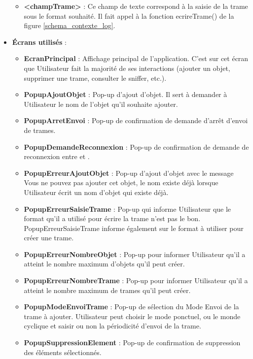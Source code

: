 \begin{itemize}
\begin{itemize}
            \item \textbf{<champTrame>} : Ce champ de texte correspond à la saisie de la trame sous le format souhaité. Il fait appel à la fonction ecrireTrame() de la figure \ref{schema_contexte_log}. \newline
        \end{itemize}
    \item \textbf{\'Ecrans utilisés} :
        \begin{itemize}
            \item \textbf{EcranPrincipal} : Affichage principal de l'application. C'est sur cet écran que Utilisateur fait la majorité de ses interactions (ajouter un objet, supprimer une trame, consulter le sniffer, etc.).
            \item \textbf{PopupAjoutObjet} : Pop-up d'ajout d'objet. Il sert à demander à Utilisateur le nom de l'objet qu'il souhaite ajouter.
            \item \textbf{PopupArretEnvoi} : Pop-up de confirmation de demande d'arrêt d'envoi de trames.
            \item \textbf{PopupDemandeReconnexion} : Pop-up de confirmation de demande de reconnexion entre {\nomApplication} et {\nomLogiciel}.
            \item \textbf{PopupErreurAjoutObjet} : Pop-up d'ajout d'objet avec le message {\guillemetleft} Vous ne pouvez pas ajouter cet objet, le nom existe déjà {\guillemetright} lorsque Utilisateur écrit un nom d'objet qui existe déjà. 
            \item \textbf{PopupErreurSaisieTrame} : Pop-up qui informe Utilisateur que le format qu'il a utilisé pour écrire la trame n'est pas le bon. PopupErreurSaisieTrame informe également sur le format à utiliser pour créer une trame.
            \item \textbf{PopupErreurNombreObjet} : Pop-up pour informer Utilisateur qu'il a atteint le nombre maximum d'objets qu'il peut créer. 
            \item \textbf{PopupErreurNombreTrame} : Pop-up pour informer Utilisateur qu'il a atteint le nombre maximum de trames qu'il peut créer.
            \item \textbf{PopupModeEnvoiTrame} : Pop-up de sélection du Mode Envoi de la trame à ajouter. Utilisateur peut choisir le mode ponctuel, ou le monde cyclique et saisir ou non la périodicité d'envoi de la trame.
            \item \textbf{PopupSuppressionElement} : Pop-up de confirmation de suppression des éléments sélectionnés. 

\end{itemize}
\end{itemize}
